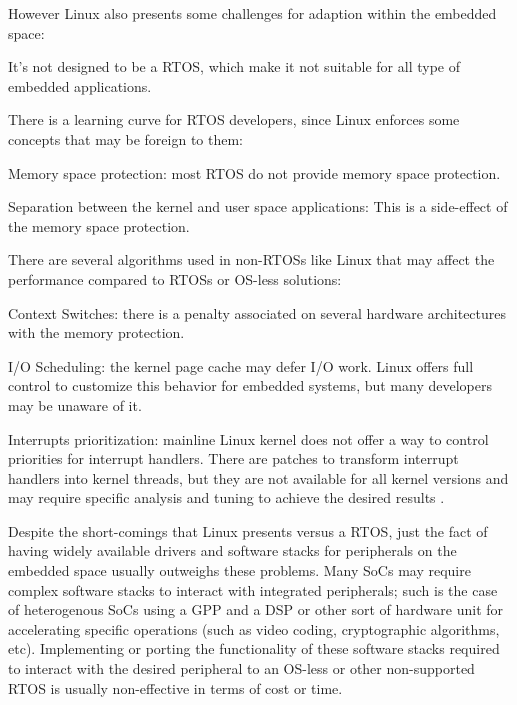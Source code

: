 However Linux also presents some challenges for adaption within the embedded space:
\begin{itemize*}
\item It's not designed to be a \ac{RTOS}, which make it not suitable for all type of embedded applications.
\item There is a learning curve for \ac{RTOS} developers, since Linux enforces some concepts that may be foreign to them:
	\begin{itemize*}
	\item Memory space protection: most \ac{RTOS} do not provide memory space protection.
	\item Separation between the kernel and user space applications: This is a side-effect of the memory space protection.
	\end{itemize*}
\item There are several algorithms used in non-\acp{RTOS} like Linux that may affect the performance compared to \acp{RTOS} or \ac{OS}-less solutions:
	\begin{itemize*}
	\item Context Switches: there is a penalty associated on several hardware architectures with the memory protection.
	\item I/O Scheduling: the kernel page cache may defer I/O work. Linux offers full control to customize this behavior for embedded systems, but many developers may be unaware of it.
	\item Interrupts prioritization: mainline Linux kernel does not offer a way to control priorities for interrupt handlers. There are patches to transform interrupt handlers into kernel threads, but they are not available for all kernel versions and may require specific analysis and tuning to achieve the desired results \cite{Song_Chubb_10}.
	\end{itemize*}
\end{itemize*}

Despite the short-comings that Linux presents versus a \ac{RTOS}, just the fact of having widely available drivers and software stacks for peripherals on the embedded space usually outweighs these problems. Many \acp{SoC} may require complex software stacks to interact with integrated peripherals; such is the case of heterogenous \acp{SoC} using a \ac{GPP} and a \ac{DSP} or other sort of hardware unit for accelerating specific operations (such as video coding, cryptographic algorithms, etc). Implementing or porting the functionality of these software stacks required to interact with the desired peripheral to an \ac{OS}-less or other non-supported \ac{RTOS} is usually non-effective in terms of cost or time.

